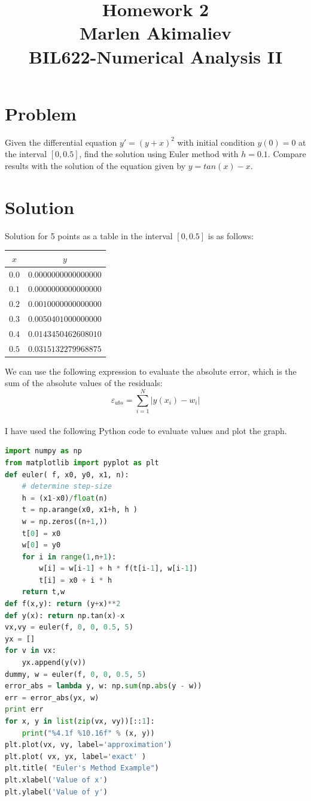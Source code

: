 \documentclass[a4paper,10pt]{article}
\date{\displaydate{date}}
\title{Homework 2\\Marlen Akimaliev\\BIL622-Numerical Analysis II}
\begin{document}
\maketitle

\section{Problem}
Given the differential equation $y'=(y+x)^2$ with initial condition $y(0)=0$ at the interval $[0, 0.5]$, find the solution using Euler method with $h=0.1$. Compare results with the solution of the equation given by $y = tan(x)-x$.
\section{Solution}
Solution for 5 points as a table in the interval $[0, 0.5]$ is as follows:
\begin{center}
\begin{tabular}{ |c|c| } 
 \hline
 $x$ & $y$\\
\hline
 $0.0$ & $0.0000000000000000$\\
 $0.1$ & $0.0000000000000000$\\
 $0.2$ & $0.0010000000000000$\\
 $0.3$ & $0.0050401000000000$\\
 $0.4$ & $0.0143450462608010$\\
 $0.5$ & $0.0315132279968875$\\
 \hline
\end{tabular}
\end{center}
We can use the following expression to evaluate the absolute error, which is the sum of the absolute values of the residuals:\\
$$\varepsilon_{abs} = \sum_{i=1}^{N} |y(x_i)-w_i|$$\\
I have used the following Python code \cite{connor} to evaluate values and plot the graph.
\begin{lstlisting}[language=Python]
import numpy as np
from matplotlib import pyplot as plt
def euler( f, x0, y0, x1, n):
	# determine step-size
	h = (x1-x0)/float(n)             
	t = np.arange(x0, x1+h, h )         
	w = np.zeros((n+1,))                     
	t[0] = x0
	w[0] = y0   
	for i in range(1,n+1):                       
		w[i] = w[i-1] + h * f(t[i-1], w[i-1])
		t[i] = x0 + i * h
	return t,w
def f(x,y): return (y+x)**2
def y(x): return np.tan(x)-x
vx,vy = euler(f, 0, 0, 0.5, 5)
yx = []
for v in vx:
	yx.append(y(v))
dummy, w = euler(f, 0, 0, 0.5, 5)
error_abs = lambda y, w: np.sum(np.abs(y - w))
err = error_abs(yx, w)
print err
for x, y in list(zip(vx, vy))[::1]:
    print("%4.1f %10.16f" % (x, y))
plt.plot(vx, vy, label='approximation')
plt.plot( vx, yx, label='exact' )
plt.title( "Euler's Method Example")
plt.xlabel('Value of x') 
plt.ylabel('Value of y')
\end{lstlisting}
\end{document}
